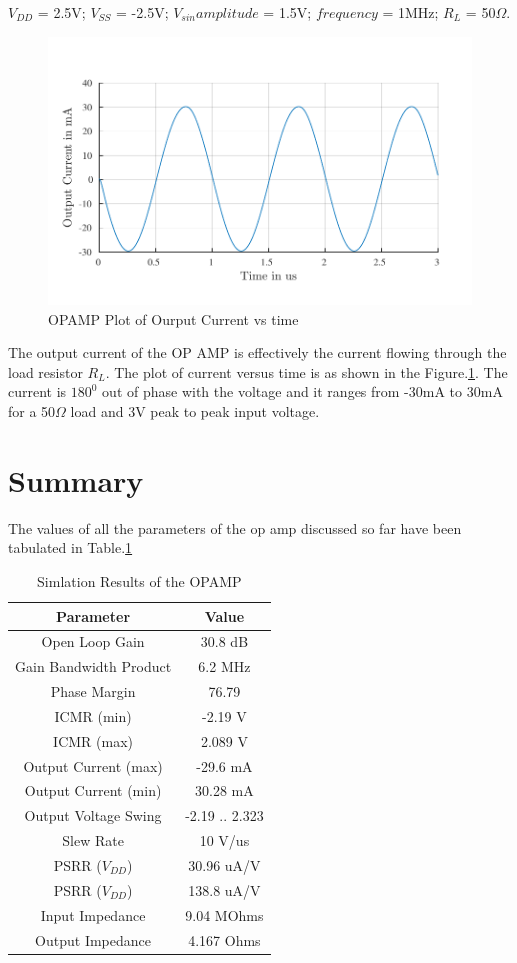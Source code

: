 $V_{DD}$ = 2.5V; $V_{SS}$ = -2.5V; $V_{sin} amplitude $ = 1.5V; $frequency$ = 1MHz; $R_L$ = 50$\Omega$.
\begin{figure} [H]
\centering
\includegraphics[scale=1]{Figures/Plots/OPAMP_Iout.pdf}
\caption{OPAMP Plot of Ourput Current vs time}
\label{fig:OPAMP_Iout}
\end{figure}
The output current of the OP AMP is effectively the current flowing through the load resistor $R_L$. The plot of current versus time is as shown in the Figure.\ref{fig:OPAMP_Iout}. The current is $180^0$ out of phase with the voltage and it ranges from -30mA to 30mA for a 50$\Omega$ load and 3V peak to peak input voltage. 

\section{Summary}

The values of all the parameters of the op amp discussed so far have been tabulated in Table.\ref{tab:OPAMP_Results}
\begin{table} [H]
\centering
\begin{tabular}{@{}cc@{}}
\toprule
Parameter					& Value				\\ \midrule
Open Loop Gain				& 30.8 dB			\\
Gain Bandwidth Product		& 6.2 MHz			\\
Phase Margin				& 76.79				\\
ICMR (min)					& -2.19 V			\\
ICMR (max)					& 2.089 V			\\
Output Current (max)		& -29.6 mA			\\
Output Current (min)		& 30.28 mA			\\
Output Voltage Swing		& -2.19 .. 2.323 	\\
Slew Rate					& 10 V/us			\\
PSRR ($V_{DD}$)				& 30.96 uA/V		\\
PSRR ($V_{DD}$)				& 138.8 uA/V		\\
Input Impedance				& 9.04 MOhms		\\
Output Impedance			& 4.167 Ohms		\\
\bottomrule
\end{tabular}
\caption{Simlation Results of the OPAMP}
\label{tab:OPAMP_Results}
\end{table}

